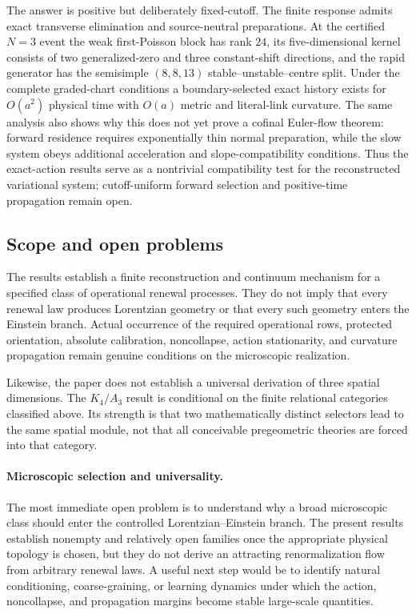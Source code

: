 \documentclass[11pt]{article}
\numberwithin{equation}{section}
\theoremstyle{definition}
\theoremstyle{remark}
\begin{document}
The answer is positive but deliberately fixed-cutoff.  The finite response
admits exact transverse elimination and source-neutral preparations.  At the
certified $N=3$ event the weak first-Poisson block has rank $24$, its
five-dimensional kernel consists of two generalized-zero and three
constant-shift directions, and the rapid generator has the semisimple
$(8,8,13)$ stable--unstable--centre split.  Under the complete graded-chart
conditions a boundary-selected exact history exists for $O(a^2)$ physical
time with $O(a)$ metric and literal-link curvature.  The same analysis also
shows why this does not yet prove a cofinal Euler-flow theorem: forward
residence requires exponentially thin normal preparation, while the slow
system obeys additional acceleration and slope-compatibility conditions.
Thus the exact-action results serve as a nontrivial compatibility test for the
reconstructed variational system; cutoff-uniform forward selection and
positive-time propagation remain open.


\subsection{Scope and open problems}

The results establish a finite reconstruction and continuum mechanism for a
specified class of operational renewal processes.  They do not imply that
every renewal law produces Lorentzian geometry or that every such geometry
enters the Einstein branch.  Actual occurrence of the required operational
rows, protected orientation, absolute calibration, noncollapse, action
stationarity, and curvature propagation remain genuine conditions on the
microscopic realization.

Likewise, the paper does not establish a universal derivation of three
spatial dimensions.  The $K_4/A_3$ result is conditional on the finite
relational categories classified above.  Its strength is that two
mathematically distinct selectors lead to the same spatial module, not that
all conceivable pregeometric theories are forced into that category.

\paragraph{Microscopic selection and universality.}

The most immediate open problem is to understand why a broad microscopic
class should enter the controlled Lorentzian--Einstein branch.  The present
results establish nonempty and relatively open families once the appropriate
physical topology is chosen, but they do not derive an attracting
renormalization flow from arbitrary renewal laws.  A useful next step would
be to identify natural conditioning, coarse-graining, or learning dynamics
under which the action, noncollapse, and propagation margins become stable
large-scale quantities.
\end{document}
